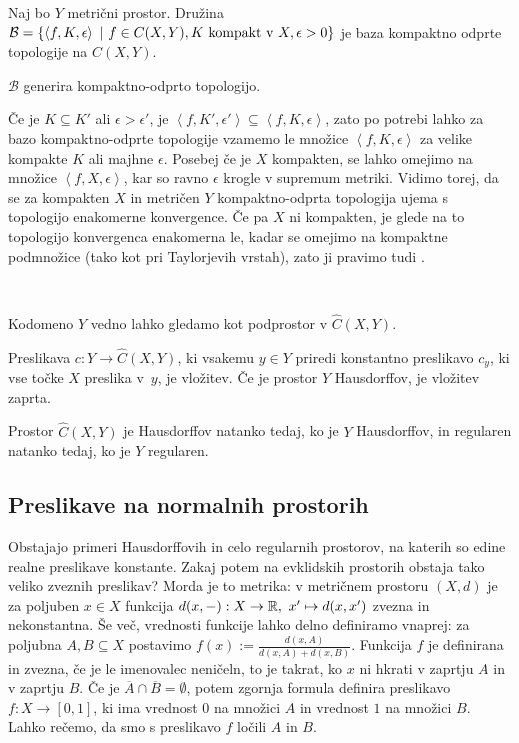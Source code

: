 \begin{trditev}
    Naj bo $Y$ metrični prostor. Družina $\mathcal{B} = \left\{\left\langle f, K, \epsilon \right\rangle \ | \ f \in C(X, Y), K \text{ kompakt v } X, \epsilon>0\right\}$ je baza kompaktno odprte topologije na $C(X, Y)$.
\end{trditev}

\begin{opomba}
    \(\mathcal{B}\) generira kompaktno-odprto topologijo.
\end{opomba}

Če je $K \subseteq K'$ ali $\epsilon > \epsilon'$, je $\left\langle f, K', \epsilon' \right\rangle \subseteq \left\langle f, K, \epsilon \right\rangle$, zato po potrebi lahko za bazo kompaktno-odprte topologije vzamemo le množice \(\left\langle f, K, \epsilon \right\rangle\) za velike kompakte $K$ ali majhne $\epsilon$. Posebej če je $X$ kompakten, se lahko omejimo na množice \(\left\langle f, X, \epsilon \right\rangle\), kar so ravno $\epsilon$ krogle v supremum metriki. Vidimo torej, da se za kompakten $X$ in metričen $Y$ kompaktno-odprta topologija ujema s topologijo enakomerne konvergence. Če pa $X$ ni kompakten, je glede na to topologijo konvergenca enakomerna le, kadar se omejimo na kompaktne podmnožice (tako kot pri Taylorjevih vrstah), zato ji pravimo tudi .

\ 

Kodomeno $Y$ vedno lahko gledamo kot podprostor v $\widehat{C}(X,Y)$.
\begin{trditev}
    Preslikava $c: Y \to \widehat{C}(X,Y)$, ki vsakemu $y \in Y$ priredi konstantno preslikavo $c_y$, ki vse točke $X$ preslika v~$y$, je vložitev. Če je prostor $Y$ Hausdorffov, je vložitev zaprta.
\end{trditev}

\begin{trditev}
    Prostor $\widehat{C}(X,Y)$ je Hausdorffov natanko tedaj, ko je $Y$ Hausdorffov, in regularen natanko tedaj, ko je $Y$ regularen.
\end{trditev}

\subsection{Preslikave na normalnih prostorih}
Obstajajo primeri Hausdorffovih in celo regularnih prostorov, na katerih so edine realne preslikave konstante. Zakaj potem na evklidskih prostorih obstaja tako veliko zveznih preslikav? Morda je to metrika: v metričnem prostoru $(X,d)$ je za poljuben $x \in X$ funkcija $d(x,-): X \to \mathbb{R}, \ x' \mapsto d(x, x')$ zvezna in nekonstantna. Še več, vrednosti funkcije lahko delno definiramo vnaprej: za poljubna $A, B \subseteq X$ postavimo $f(x) := \frac{d(x, A)}{d(x, A) + d(x, B)}$. Funkcija $f$ je definirana in zvezna, če je le imenovalec neničeln, to je takrat, ko $x$ ni hkrati v zaprtju $A$ in v zaprtju $B$. Če je $\overline{A} \cap \overline{B} = \emptyset$, potem zgornja formula definira preslikavo $f: X \to [0,1]$, ki ima vrednost $0$ na množici $A$ in vrednost $1$ na množici $B$. Lahko rečemo, da smo s preslikavo $f$ ločili $A$ in $B$.

